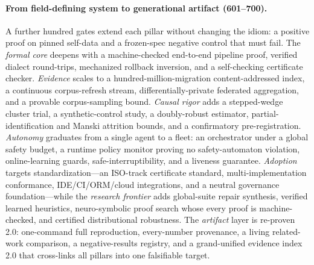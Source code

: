 \documentclass[11pt]{article}
\begin{document}
\paragraph{From field-defining system to generational artifact (601--700).}
A further hundred gates extend each pillar without changing the idiom: a positive proof on pinned
self-data and a frozen-spec negative control that must fail. The \emph{formal core} deepens with a
machine-checked end-to-end pipeline proof, verified dialect round-trips, mechanized rollback inversion,
and a self-checking certificate checker. \emph{Evidence} scales to a hundred-million-migration
content-addressed index, a continuous corpus-refresh stream, differentially-private federated
aggregation, and a provable corpus-sampling bound. \emph{Causal rigor} adds a stepped-wedge cluster
trial, a synthetic-control study, a doubly-robust estimator, partial-identification and Manski
attrition bounds, and a confirmatory pre-registration. \emph{Autonomy} graduates from a single agent
to a fleet: an orchestrator under a global safety budget, a runtime policy monitor proving no
safety-automaton violation, online-learning guards, safe-interruptibility, and a liveness guarantee.
\emph{Adoption} targets standardization---an ISO-track certificate standard, multi-implementation
conformance, IDE/CI/ORM/cloud integrations, and a neutral governance foundation---while the
\emph{research frontier} adds global-suite repair synthesis, verified learned heuristics, neuro-symbolic
proof search whose every proof is machine-checked, and certified distributional robustness. The
\emph{artifact} layer is re-proven 2.0: one-command full reproduction, every-number provenance, a
living related-work comparison, a negative-results registry, and a grand-unified evidence index 2.0
that cross-links all pillars into one falsifiable target.
\end{document}
